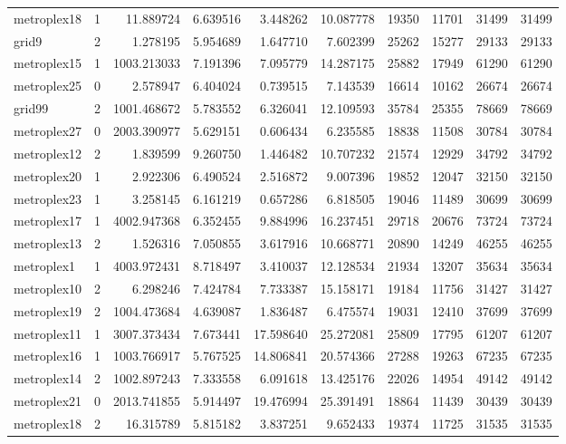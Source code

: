 \begin{longtable}{|l|r|r|r|r|r|r|r|r|r|}
metroplex18 & 1 & 11.889724 & 6.639516 & 3.448262 & 10.087778 & 19350 & 11701 & 31499 & 31499 \\
grid9 & 2 & 1.278195 & 5.954689 & 1.647710 & 7.602399 & 25262 & 15277 & 29133 & 29133 \\
metroplex15 & 1 & 1003.213033 & 7.191396 & 7.095779 & 14.287175 & 25882 & 17949 & 61290 & 61290 \\
metroplex25 & 0 & 2.578947 & 6.404024 & 0.739515 & 7.143539 & 16614 & 10162 & 26674 & 26674 \\
grid99 & 2 & 1001.468672 & 5.783552 & 6.326041 & 12.109593 & 35784 & 25355 & 78669 & 78669 \\
metroplex27 & 0 & 2003.390977 & 5.629151 & 0.606434 & 6.235585 & 18838 & 11508 & 30784 & 30784 \\
metroplex12 & 2 & 1.839599 & 9.260750 & 1.446482 & 10.707232 & 21574 & 12929 & 34792 & 34792 \\
metroplex20 & 1 & 2.922306 & 6.490524 & 2.516872 & 9.007396 & 19852 & 12047 & 32150 & 32150 \\
metroplex23 & 1 & 3.258145 & 6.161219 & 0.657286 & 6.818505 & 19046 & 11489 & 30699 & 30699 \\
metroplex17 & 1 & 4002.947368 & 6.352455 & 9.884996 & 16.237451 & 29718 & 20676 & 73724 & 73724 \\
metroplex13 & 2 & 1.526316 & 7.050855 & 3.617916 & 10.668771 & 20890 & 14249 & 46255 & 46255 \\
metroplex1 & 1 & 4003.972431 & 8.718497 & 3.410037 & 12.128534 & 21934 & 13207 & 35634 & 35634 \\
metroplex10 & 2 & 6.298246 & 7.424784 & 7.733387 & 15.158171 & 19184 & 11756 & 31427 & 31427 \\
metroplex19 & 2 & 1004.473684 & 4.639087 & 1.836487 & 6.475574 & 19031 & 12410 & 37699 & 37699 \\
metroplex11 & 1 & 3007.373434 & 7.673441 & 17.598640 & 25.272081 & 25809 & 17795 & 61207 & 61207 \\
metroplex16 & 1 & 1003.766917 & 5.767525 & 14.806841 & 20.574366 & 27288 & 19263 & 67235 & 67235 \\
metroplex14 & 2 & 1002.897243 & 7.333558 & 6.091618 & 13.425176 & 22026 & 14954 & 49142 & 49142 \\
metroplex21 & 0 & 2013.741855 & 5.914497 & 19.476994 & 25.391491 & 18864 & 11439 & 30439 & 30439 \\
metroplex18 & 2 & 16.315789 & 5.815182 & 3.837251 & 9.652433 & 19374 & 11725 & 31535 & 31535 \\

\end{longtable}
